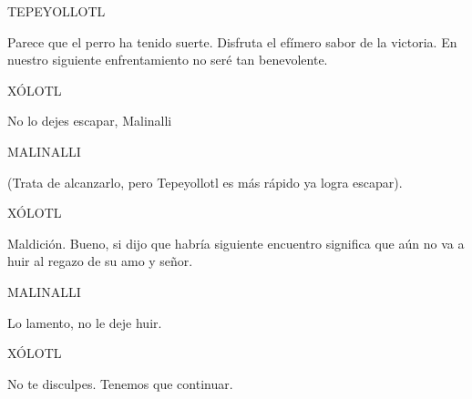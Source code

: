 \documentclass[11pt,letterpaper]{article}
\begin{document}
\begin{center}
TEPEYOLLOTL
\\
\par
Parece que el perro ha tenido suerte. Disfruta el efímero sabor de la victoria. En nuestro siguiente enfrentamiento no seré tan benevolente.
\\
\par
XÓLOTL
\\
\par
No lo dejes escapar, Malinalli
\\
\par
MALINALLI
\\
\par
(Trata de alcanzarlo, pero Tepeyollotl es más rápido ya logra escapar).
\\
\par
XÓLOTL
\\
\par
Maldición. Bueno, si dijo que habría siguiente encuentro significa que aún no va a huir al regazo de su amo y señor.
\\
\par
MALINALLI
\\
\par
Lo lamento, no le deje huir.
\\
\par
XÓLOTL
\\
\par
No te disculpes. Tenemos que continuar.
\end{center}
\end{document}
